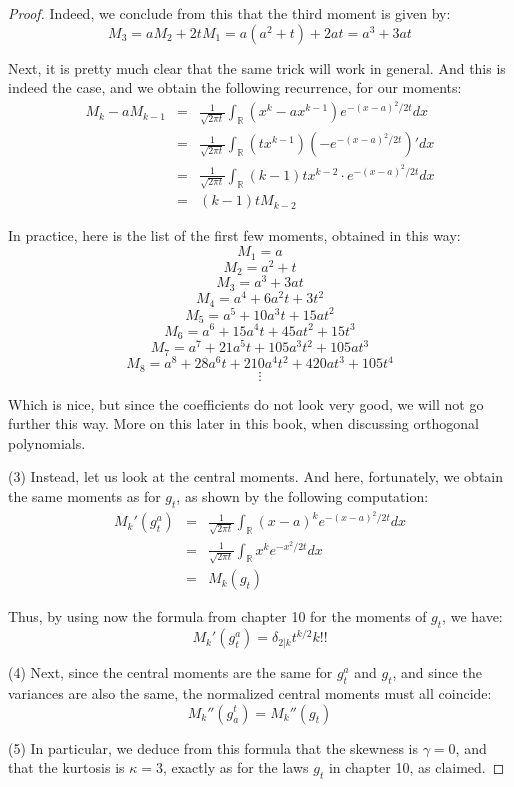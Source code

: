 \documentclass[12pt]{amsbook}
\begin{document}
\begin{proof}
Indeed, we conclude from this that the third moment is given by:
$$M_3=aM_2+2tM_1=a(a^2+t)+2at=a^3+3at$$

Next, it is pretty much clear that the same trick will work in general. And this is indeed the case, and we obtain the following recurrence, for our moments:
\begin{eqnarray*}
M_k-aM_{k-1}
&=&\frac{1}{\sqrt{2\pi t}}\int_\mathbb R(x^k-ax^{k-1})e^{-(x-a)^2/2t}dx\\
&=&\frac{1}{\sqrt{2\pi t}}\int_\mathbb R(tx^{k-1})\left(-e^{-(x-a)^2/2t}\right)'dx\\
&=&\frac{1}{\sqrt{2\pi t}}\int_\mathbb R(k-1)tx^{k-2}\cdot e^{-(x-a)^2/2t}dx\\
&=&(k-1)tM_{k-2}
\end{eqnarray*}

In practice, here is the list of the first few moments, obtained in this way:
$$M_1=a$$
$$M_2=a^2+t$$
$$M_3=a^3+3at$$
$$M_4=a^4+6a^2t+3t^2$$
$$M_5=a^5+10a^3t+15at^2$$
$$M_6=a^6+15a^4t+45at^2+15t^3$$
$$M_7=a^7+21a^5t+105a^3t^2+105at^3$$
$$M_8=a^8+28a^6t+210a^4t^2+420at^3+105t^4$$
$$\vdots$$

Which is nice, but since the coefficients do not look very good, we will not go further this way. More on this later in this book, when discussing orthogonal polynomials.

\medskip

(3) Instead, let us look at the central moments. And here, fortunately, we obtain the same moments as for $g_t$, as shown by the following computation:
\begin{eqnarray*}
M_k'(g_t^a)
&=&\frac{1}{\sqrt{2\pi t}}\int_\mathbb R(x-a)^ke^{-(x-a)^2/2t}dx\\
&=&\frac{1}{\sqrt{2\pi t}}\int_\mathbb Rx^ke^{-x^2/2t}dx\\
&=&M_k(g_t)
\end{eqnarray*}

Thus, by using now the formula from chapter 10 for the moments of $g_t$, we have:
$$M_k'(g_t^a)=\delta_{2|k}t^{k/2}k!!$$

(4) Next, since the central moments are the same for $g_t^a$ and $g_t$, and since the variances are also the same, the normalized central moments must all coincide:
$$M_k''(g^t_a)=M_k''(g_t)$$

(5) In particular, we deduce from this formula that the skewness is $\gamma=0$, and that the kurtosis is $\kappa=3$, exactly as for the laws $g_t$ in chapter 10, as claimed.

\medskip


\end{proof}
\end{document}

